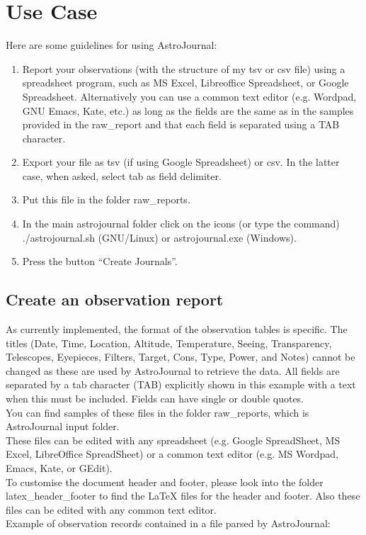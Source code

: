 \section{Use Case}
\label{sec:Use Case}
Here are some guidelines for using AstroJournal:\\
\begin{enumerate}
 \item Report your observations (with the structure of my tsv or csv file) using a spreadsheet program, such as MS Excel, Libreoffice Spreadsheet, or Google Spreadsheet. Alternatively you can use a common text editor (e.g. Wordpad, GNU Emacs, Kate, etc.) as long as the fields are the same as in the samples provided in the raw\_report and that each field is separated using a TAB character.
 \item Export your file as tsv (if using Google Spreadsheet) or csv. In the latter case, when asked, select tab as field delimiter.
 \item Put this file in the folder raw\_reports.
 \item In the main astrojournal folder click on the icons (or type the command) ./astrojournal.sh (GNU/Linux) or astrojournal.exe (Windows).
 \item Press the button ``Create Journals''.
\end{enumerate}



\subsection{Create an observation report}
\label{sec:Create an observation report}
As currently implemented, the format of the observation tables is specific. The titles (Date, Time, Location, Altitude, Temperature, Seeing, Transparency, Telescopes, Eyepieces, Filters, Target, Cons, Type, Power, and Notes) cannot be changed as these are used by AstroJournal to retrieve the data. All fields are separated by a tab character (TAB) explicitly shown in this example with a text when this must be included. Fields can have single or double quotes.\\
You can find samples of these files in the folder raw\_reports, which is 
AstroJournal input folder.\\
These files can be edited with any spreadsheet (e.g. Google SpreadSheet, MS Excel, LibreOffice SpreadSheet) or a common text editor (e.g. MS Wordpad, Emacs, Kate, or GEdit).\\
To customise the document header and footer, please look into the folder 
latex\_header\_footer to find the LaTeX files for the header and footer. Also these files can be edited with any common text editor.\\
Example of observation records contained in a file parsed by AstroJournal:\\


